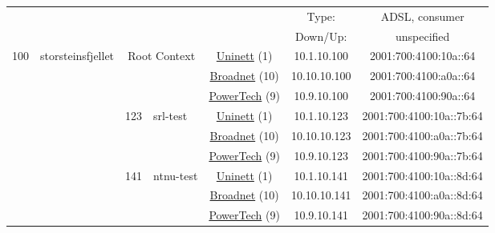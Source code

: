 \begin{small}
\begin{center}
\begin{longtable}{|c|c|c|c|c|c|c|c|}
  & \multicolumn{3}{|c|}{} & \multicolumn{2}{|c|}{} & Type: & ADSL, consumer \\* \cline{7-7}\cline{8-8}
  & \multicolumn{3}{|c|}{} & \multicolumn{2}{|c|}{} & Down/Up:  & unspecified \\ \hline
 \multirow{18}{*}{\tiny{100}} & \multicolumn{1}{|l|}{\multirow{18}{*}{\tiny{storsteinsfjellet}}} & \multicolumn{2}{|c|}{\multirow{3}{*}{\tiny{Root Context}}} & \multicolumn{2}{|c|}{\tiny{\href{https://www.uninett.no}{Uninett} (1)}} & \tiny{10.1.10.100} & \tiny{2001:700:4100:10a::64} \\* \cline{5-5}\cline{6-6}\cline{7-7}\cline{8-8}
  &  & \multicolumn{2}{|c|}{} & \multicolumn{2}{|c|}{\tiny{\href{https://www.broadnet.no}{Broadnet} (10)}} & \tiny{10.10.10.100} & \tiny{2001:700:4100:a0a::64} \\* \cline{5-5}\cline{6-6}\cline{7-7}\cline{8-8}
  &  & \multicolumn{2}{|c|}{} & \multicolumn{2}{|c|}{\tiny{\href{http://www.powertech.no}{PowerTech} (9)}} & \tiny{10.9.10.100} & \tiny{2001:700:4100:90a::64} \\* \cline{3-3}\cline{4-4}\cline{5-5}\cline{6-6}\cline{7-7}\cline{8-8}
  &  & \multirow{3}{*}{\tiny{123}} & \multicolumn{1}{|l|}{\multirow{3}{*}{\tiny{srl-test}}} & \multicolumn{2}{|c|}{\tiny{\href{https://www.uninett.no}{Uninett} (1)}} & \tiny{10.1.10.123} & \tiny{2001:700:4100:10a::7b:64} \\* \cline{5-5}\cline{6-6}\cline{7-7}\cline{8-8}
  &  &  &  & \multicolumn{2}{|c|}{\tiny{\href{https://www.broadnet.no}{Broadnet} (10)}} & \tiny{10.10.10.123} & \tiny{2001:700:4100:a0a::7b:64} \\* \cline{5-5}\cline{6-6}\cline{7-7}\cline{8-8}
  &  &  &  & \multicolumn{2}{|c|}{\tiny{\href{http://www.powertech.no}{PowerTech} (9)}} & \tiny{10.9.10.123} & \tiny{2001:700:4100:90a::7b:64} \\* \cline{3-3}\cline{4-4}\cline{5-5}\cline{6-6}\cline{7-7}\cline{8-8}
  &  & \multirow{3}{*}{\tiny{141}} & \multicolumn{1}{|l|}{\multirow{3}{*}{\tiny{ntnu-test}}} & \multicolumn{2}{|c|}{\tiny{\href{https://www.uninett.no}{Uninett} (1)}} & \tiny{10.1.10.141} & \tiny{2001:700:4100:10a::8d:64} \\* \cline{5-5}\cline{6-6}\cline{7-7}\cline{8-8}
  &  &  &  & \multicolumn{2}{|c|}{\tiny{\href{https://www.broadnet.no}{Broadnet} (10)}} & \tiny{10.10.10.141} & \tiny{2001:700:4100:a0a::8d:64} \\* \cline{5-5}\cline{6-6}\cline{7-7}\cline{8-8}
  &  &  &  & \multicolumn{2}{|c|}{\tiny{\href{http://www.powertech.no}{PowerTech} (9)}} & \tiny{10.9.10.141} & \tiny{2001:700:4100:90a::8d:64} \\* \cline{3-3}\cline{4-4}\cline{5-5}\cline{6-6}\cline{7-7}\cline{8-8}

\end{longtable}
\end{center}
\end{small}

